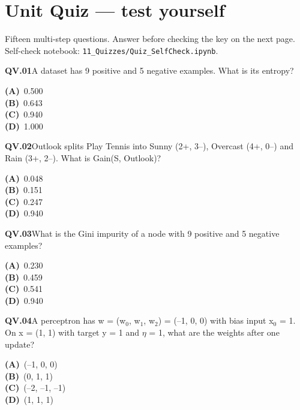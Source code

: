 \section{Unit Quiz --- test yourself}
{\small\color{slate}Fifteen multi-step questions. Answer before checking the key on the next page. Self-check notebook: \texttt{11\_Quizzes/Quiz\_SelfCheck.ipynb}.}\par\medskip
\begin{tcolorbox}[enhanced,breakable,colback=white,colframe=navyL,arc=2mm,boxrule=0.7pt,left=3mm,right=3mm,top=2mm,bottom=2mm]
\textbf{\color{navy}QV.01}\quad A dataset has 9 positive and 5 negative examples. What is its entropy?\hfill{}\par\smallskip
{\small \textbf{\color{navyL}(A)}\ 0.500\\[1pt]\textbf{\color{navyL}(B)}\ 0.643\\[1pt]\textbf{\color{navyL}(C)}\ 0.940\\[1pt]\textbf{\color{navyL}(D)}\ 1.000}
\end{tcolorbox}
\begin{tcolorbox}[enhanced,breakable,colback=white,colframe=navyL,arc=2mm,boxrule=0.7pt,left=3mm,right=3mm,top=2mm,bottom=2mm]
\textbf{\color{navy}QV.02}\quad Outlook splits Play Tennis into Sunny (2+, 3--), Overcast (4+, 0--) and Rain (3+, 2--). What is Gain(S, Outlook)?\hfill{}\par\smallskip
{\small \textbf{\color{navyL}(A)}\ 0.048\\[1pt]\textbf{\color{navyL}(B)}\ 0.151\\[1pt]\textbf{\color{navyL}(C)}\ 0.247\\[1pt]\textbf{\color{navyL}(D)}\ 0.940}
\end{tcolorbox}
\begin{tcolorbox}[enhanced,breakable,colback=white,colframe=navyL,arc=2mm,boxrule=0.7pt,left=3mm,right=3mm,top=2mm,bottom=2mm]
\textbf{\color{navy}QV.03}\quad What is the Gini impurity of a node with 9 positive and 5 negative examples?\hfill{}\par\smallskip
{\small \textbf{\color{navyL}(A)}\ 0.230\\[1pt]\textbf{\color{navyL}(B)}\ 0.459\\[1pt]\textbf{\color{navyL}(C)}\ 0.541\\[1pt]\textbf{\color{navyL}(D)}\ 0.940}
\end{tcolorbox}
\begin{tcolorbox}[enhanced,breakable,colback=white,colframe=navyL,arc=2mm,boxrule=0.7pt,left=3mm,right=3mm,top=2mm,bottom=2mm]
\textbf{\color{navy}QV.04}\quad A perceptron has w = (w$_0$, w$_1$, w$_2$) = (--1, 0, 0) with bias input x$_0$ = 1. On x = (1, 1) with target y = 1 and $\eta$ = 1, what are the weights after one update?\hfill{}\par\smallskip
{\small \textbf{\color{navyL}(A)}\ (--1, 0, 0)\\[1pt]\textbf{\color{navyL}(B)}\ (0, 1, 1)\\[1pt]\textbf{\color{navyL}(C)}\ (--2, --1, --1)\\[1pt]\textbf{\color{navyL}(D)}\ (1, 1, 1)}
\end{tcolorbox}
